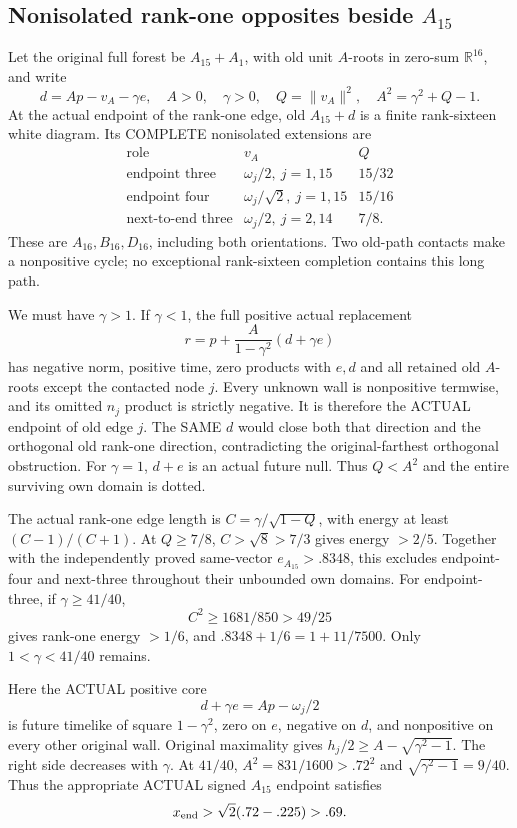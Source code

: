 \documentclass[11pt]{article}
\begin{document}
\subsection[Nonisolated rank-one opposites beside A15]{Nonisolated rank-one opposites beside \(A_{15}\)}
\label{app:arithA15nonisolated}

Let the original full forest be \(A_{15}+A_1\), with old
unit \(A\)-roots in zero-sum \(\mathbb R^{16}\), and write
\[
 d=Ap-v_A-\gamma e,\quad A>0,\quad\gamma>0,\quad
 Q=\|v_A\|^2,\quad A^2=\gamma^2+Q-1.
\]
At the actual endpoint of the rank-one edge, old \(A_{15}+d\)
is a finite rank-sixteen white diagram.
Its COMPLETE nonisolated extensions are
\[
\begin{array}{c|c|c}
\text{role}&v_A&Q\\ \hline
\text{endpoint three}&\omega_j/2,\ j=1,15&15/32\\
\text{endpoint four}&\omega_j/\sqrt2,\ j=1,15&15/16\\
\text{next-to-end three}&\omega_j/2,\ j=2,14&7/8 .
\end{array}
\]
These are \(A_{16},B_{16},D_{16}\), including both orientations.
Two old-path contacts make a nonpositive cycle; no exceptional
rank-sixteen completion contains this long path.

We must have \(\gamma>1\).
If \(\gamma<1\), the full positive actual replacement
\[
                 r=p+{\frac{A}{1-\gamma^2}}(d+\gamma e)
\]
has negative norm, positive time, zero products with \(e,d\)
and all retained old \(A\)-roots except the contacted node \(j\).
Every unknown wall is nonpositive termwise, and its omitted
\(n_j\) product is strictly negative.
It is therefore the ACTUAL endpoint of old edge \(j\).
The SAME \(d\) would close both that direction and the
orthogonal old rank-one direction, contradicting the
original-farthest orthogonal obstruction.
For \(\gamma=1\), \(d+e\) is an actual future null.
Thus \(Q<A^2\) and the entire surviving own domain is dotted.

The actual rank-one edge length is
\(C=\gamma/\sqrt{1-Q}\), with energy at least \((C-1)/(C+1)\).
At \(Q\ge7/8\), \(C>\sqrt8>7/3\) gives energy \(>2/5\).
Together with the independently proved same-vector
\(e_{A_{15}}>.8348\), this excludes endpoint-four and
next-three throughout their unbounded own domains.
For endpoint-three, if \(\gamma\ge41/40\),
\[
                  C^2\ge1681/850>49/25
\]
gives rank-one energy \(>1/6\), and
\(.8348+1/6=1+11/7500\).
Only \(1<\gamma<41/40\) remains.

Here the ACTUAL positive core
\[
                  d+\gamma e=Ap-\omega_j/2
\]
is future timelike of square \(1-\gamma^2\), zero on \(e\),
negative on \(d\), and nonpositive on every other original wall.
Original maximality gives
\(h_j/2\ge A-\sqrt{\gamma^2-1}\).
The right side decreases with \(\gamma\).
At \(41/40\), \(A^2=831/1600>.72^2\) and
\(\sqrt{\gamma^2-1}=9/40\).
Thus the appropriate ACTUAL signed \(A_{15}\) endpoint satisfies
\[
                         x_{\rm end}>\sqrt2(.72-.225)>.69 .
\]
\end{document}
